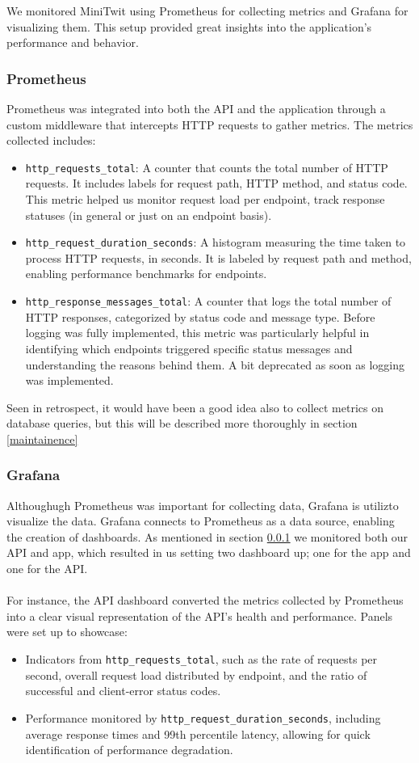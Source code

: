 We monitored MiniTwit using Prometheus for collecting metrics and Grafana for visualizing them. This setup provided great insights into the application's performance and behavior.

\subsubsection{Prometheus}\label{prom}
Prometheus was integrated into both the API and the application through a custom middleware that intercepts HTTP requests to gather metrics. The metrics collected includes:

\begin{itemize}
\item \texttt{http\_requests\_total}: A counter that counts the total number of HTTP requests. It includes labels for request path, HTTP method, and status code. This metric helped us monitor request load per endpoint, track response statuses (in general or just on an endpoint basis).
\item \texttt{http\_request\_duration\_seconds}: A histogram measuring the time taken to process HTTP requests, in seconds. It is labeled by request path and method, enabling performance benchmarks for endpoints.
\item \texttt{http\_response\_messages\_total}: A counter that logs the total number of HTTP responses, categorized by status code and message type. Before logging was fully implemented, this metric was particularly helpful in identifying which endpoints triggered specific status messages and understanding the reasons behind them. A bit deprecated as soon as logging was implemented.
\end{itemize}
Seen in retrospect, it would have been a good idea also to collect metrics on database queries, but this will be described more thoroughly in section \ref{maintainence}

\subsubsection{Grafana}
Althoughugh Prometheus was important for collecting data, Grafana is utilizto visualize the data. Grafana connects to Prometheus as a data source, enabling the creation of dashboards. As mentioned in section \ref{prom} we monitored both our API and app, which resulted in us setting two dashboard up; one for the app and one for the API.
\\\\
For instance, the API dashboard converted the metrics collected by Prometheus into a clear visual representation of the API's health and performance. Panels were set up to showcase:
\begin{itemize}
    \item Indicators from \texttt{http\_requests\_total}, such as the rate of requests per second, overall request load distributed by endpoint, and the ratio of successful and client-error status codes.
    \item Performance monitored by \texttt{http\_request\_duration\_seconds}, including average response times and 99th percentile latency, allowing for quick identification of performance degradation.
\end{itemize}